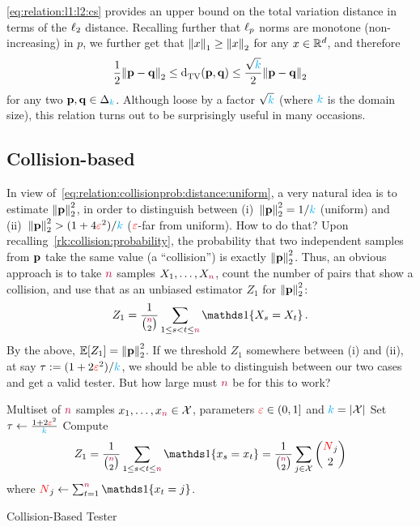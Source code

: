 \begin{remark}
  \label{rk:relation:l1:l2}
  \cref{eq:relation:l1:l2:cs} provides an upper bound on the total variation distance in terms of the $\lp[2]$ distance. Recalling further that $\lp[p]$ norms are monotone (non-increasing) in $p$, we further get that $\normone{x}\geq \normtwo{x}$ for any $x\in\R^d$, and therefore
\begin{equation}
  \label{eq:relation:l1:l2:overall}
  \frac{1}{2}\normtwo{\p-\q} \leq \totalvardist{\p}{\q} \leq \frac{\sqrt{\ab}}{2}\normtwo{\p-\q}
\end{equation}
for any two $\p,\q\in\distribs{\ab}$. Although loose by a factor $\sqrt{\ab}$ (where $\ab$ is the domain size), this relation turns out to be surprisingly useful in many occasions.
\end{remark}

\subsection{Collision-based}
  \label{sec:uniformity:collision-based}
 In view of~\cref{eq:relation:collisionprob:distance:uniform}, a very natural idea is to estimate $\normtwo{\p}^2$, in order to distinguish between (i)~$\normtwo{\p}^2 = 1/\ab$ (uniform) and (ii)~$\normtwo{\p}^2 > (1+4\dst^2)/\ab$ ($\dst$-far from uniform). How to do that? Upon recalling~\cref{rk:collision:probability}, the probability that two independent samples from $\p$ take the same value (a ``collision'') is exactly $\normtwo{\p}^2$. Thus, 
an obvious approach is to take $\ns$ samples $X_1,\dots,X_\ns$, count the number of pairs that show a collision, and use that as an unbiased estimator $Z_1$ for $\normtwo{\p}^2$:
\begin{equation}
  \label{eq:def:z1}
    Z_1 = \frac{1}{\binom{\ns}{2}} \sum_{1\leq s < t \leq \ns} \indic{X_s=X_t}\,.
\end{equation}
By the above, $\expect{Z_1} = \normtwo{\p}^2$. If we threshold $Z_1$ somewhere between (i) and (ii), at say $\tau\eqdef (1+2\dst^2)/\ab$, we should be able to distinguish between our two cases and get a valid tester. But how large must $\ns$ be for this to work? 

\begin{algorithm}[ht!]
  \begin{algorithmic}[1]
    \Require Multiset of $\ns$ samples $x_1,\dots,x_\ns \in \domain$, parameters $\dst\in(0,1]$ and $\ab = \abs{\domain}$
    \State Set $\tau \gets \frac{1+2\dst^2}{\ab}$
    \State Compute 
    \[
        Z_1 = \frac{1}{\binom{\ns}{2}} \sum_{1\leq s < t \leq \ns} \indic{x_s=x_t} = \frac{1}{\binom{\ns}{2}} \sum_{j\in\domain} \binom{\occur_j}{2}
    \] where $\occur_j \gets \sum_{t=1}^\ns\indic{x_t=j}$.
     \Return \reject {}
    \Else\ 
      \Return \accept {}
    \EndIf
  \end{algorithmic}
  \caption{\label{algo:collision-based}\sc Collision-Based Tester}
\end{algorithm}

